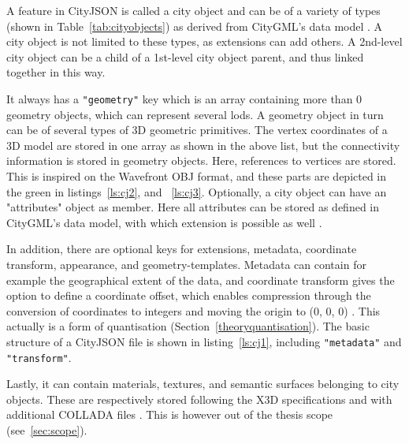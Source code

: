 A feature in CityJSON is called a city object and can be of a variety of types (shown in Table~\ref{tab:cityobjects}) as derived from CityGML's data model \citep{ledoux2019cityjson}.
A city object is not limited to these types, as extensions can add others.
A 2nd-level city object can be a child of a 1st-level city object parent, and thus linked together in this way.





It always has a \texttt{"geometry"} key which is an array containing more than 0 geometry objects, which can represent several \ac{lod}s.
A geometry object in turn can be of several types of 3D geometric primitives.
The vertex coordinates of a 3D model are stored in one array as shown in the above list, but the connectivity information is stored in geometry objects.
Here, references to vertices are stored.
This is inspired on the Wavefront OBJ \citep{Reddy} format, and these parts are depicted in the green in listings~\ref{ls:cj2}, and ~\ref{ls:cj3}.
Optionally, a city object can have an "attributes" object as member.
Here all attributes can be stored as defined in CityGML's data model, with which extension is possible as well \citep{ledoux2019cityjson, cityjsonspecs}.


In addition, there are optional keys for extensions, metadata, coordinate transform, appearance, and geometry-templates. 
Metadata can contain for example the geographical extent of the data, and coordinate transform gives the option to define a coordinate offset, which enables compression through the conversion of coordinates to integers and moving the origin to (0, 0, 0) \citep{ledoux2019cityjson, cityjsonspecs}.
This actually is a form of quantisation (Section~\ref{theoryquantisation}).
The basic structure of a CityJSON file is shown in listing~\ref{ls:cj1}, including \texttt{"metadata"} and \texttt{"transform"}.

Lastly, it can contain materials, textures, and semantic surfaces belonging to city objects.
These are respectively stored following the X3D specifications and with additional COLLADA files \citep{ledoux2019cityjson, cityjsonspecs}.
This is however out of the thesis scope (see~\ref{sec:scope}).

